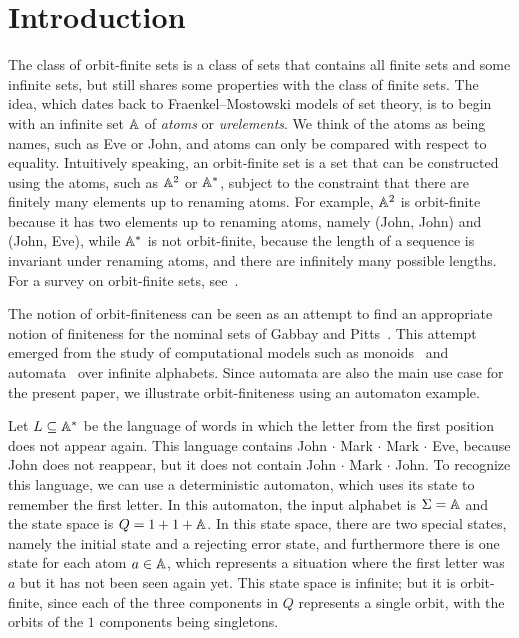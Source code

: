 \section{Introduction}
The class of orbit-finite sets is a class of sets that contains all finite sets and some infinite sets, but still shares some properties with the class of finite sets.  The idea, which dates back to Fraenkel--Mostowski models of set theory,  is to begin with an infinite set $\mathbb A$ of \emph{atoms} or \emph{urelements}. We think of the atoms as being names, such as Eve or John, and atoms can only be compared with respect to equality. Intuitively speaking, an  orbit-finite set is a set  that can be constructed using the atoms, such as $\mathbb A^2$ or $\mathbb A^*$, subject to the constraint that there are finitely many elements up to  renaming atoms. For example, $\mathbb A^2$ is orbit-finite because it has two elements up to renaming atoms, namely (John, John) and (John, Eve), while $\mathbb A^*$ is not orbit-finite, because the length of a sequence is invariant under renaming atoms, and there are infinitely many possible lengths. For a survey on orbit-finite sets, see~\cite{bojanczyk_slightly2018}.

The notion of orbit-finiteness can be seen as an attempt to find an appropriate notion of finiteness for the  nominal sets of Gabbay and Pitts~\cite{PittsAM:nomsns}.  This attempt emerged from the study of computational models such as monoids~\cite{bojanczykNominalMonoids2013} and automata~\cite{bojanczykAutomataTheoryNominal2014} over infinite alphabets. Since automata are also the main use case for the present paper, we illustrate orbit-finiteness using an automaton example. 

\begin{example}\label{ex:first-letter-repeats}
    Let  $L \subseteq \mathbb A^*$ be the language of  words in which the letter from the first position does not appear again. This language contains John $\cdot$ Mark $\cdot$ Mark $\cdot$ Eve, because John does not reappear, but it does not contain John $\cdot$ Mark $\cdot$ John. To recognize this language, we can use a deterministic automaton, which uses its state to remember the first letter. In this automaton, the input alphabet is $\Sigma = \mathbb A$ and  the state space is $Q = 1 + 1 + \mathbb A$. In this state space, there are two special states, namely the initial state and a rejecting error state, and furthermore there is one state for each atom $a \in \mathbb A$, which represents a situation where the first letter was $a$ but it has not been seen again yet. This state space is infinite; but it is orbit-finite, since each of the three components in $Q$ represents a single orbit, with the orbits of the $1$ components being singletons.\exampleend
\end{example}

